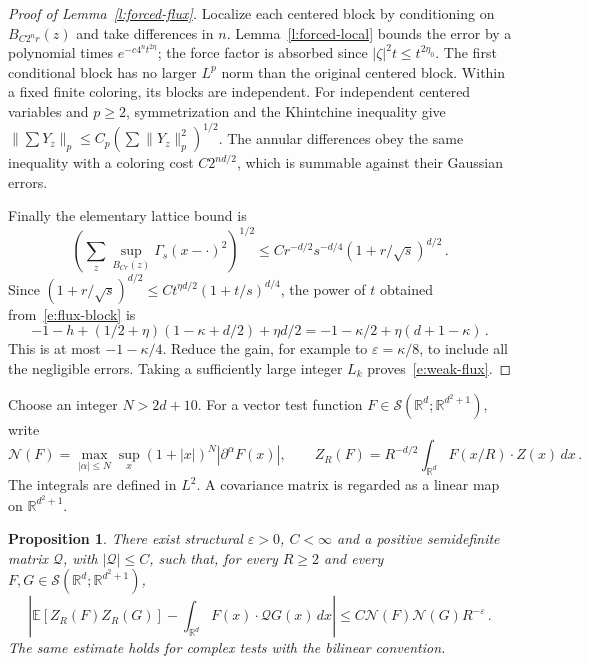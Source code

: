 \documentclass[11pt]{amsart}
\newtheorem{proposition}{Proposition}[section]
\theoremstyle{definition}
\theoremstyle{remark}
\numberwithin{equation}{section}
\newcommand{\E}{\mathbb E}
\newcommand{\R}{\mathbb R}
\newcommand{\dd}{\,d}
\newcommand{\abs}[1]{\left|#1\right|}
\begin{document}
\begin{proof}[Proof of Lemma~\ref{l:forced-flux}]
Localize each centered block by conditioning on $B_{C2^nr}(z)$ and take differences in $n$. Lemma~\ref{l:forced-local} bounds the error by a polynomial times $e^{-c4^nt^{2\eta}}$; the force factor is absorbed since $|\zeta|^2t\leq t^{2\eta_0}$. The first conditional block has no larger $L^p$ norm than the original centered block. Within a fixed finite coloring, its blocks are independent. For independent centered variables and $p\geq2$, symmetrization and the Khintchine inequality give $\|\sum Y_z\|_p\leq C_p(\sum\|Y_z\|_p^2)^{1/2}$. The annular differences obey the same inequality with a coloring cost $C2^{nd/2}$, which is summable against their Gaussian errors.

Finally the elementary lattice bound is
\begin{equation*}
 \left(\sum_z\sup_{B_{Cr}(z)}\Gamma_s(x-\cdot)^2\right)^{1/2}
 \leq Cr^{-d/2}s^{-d/4}(1+r/\sqrt s)^{d/2}\, .
\end{equation*}
Since $(1+r/\sqrt s)^{d/2} \leq Ct^{\eta d/2}(1+t/s)^{d/4}$, the power of $t$ obtained from~\eqref{e:flux-block} is
\begin{equation*}
 -1-h+(1/2+\eta)(1-\kappa+d/2)+\eta d/2
 =-1-\kappa/2+\eta(d+1-\kappa)\, .
\end{equation*}
This is at most $-1-\kappa/4$. Reduce the gain, for example to $\varepsilon=\kappa/8$, to include all the negligible errors. Taking a sufficiently large integer $L_k$ proves~\eqref{e:weak-flux}.
\end{proof}

Choose an integer $N>2d+10$. For a vector test function $F\in\mathcal S(\R^d;\R^{d^2+1})$, write
\begin{equation*}
 \mathcal N(F)=\max_{|\alpha|\leq N}
  \sup_x(1+|x|)^N|\partial^\alpha F(x)|,
 \qquad
 Z_R(F)=R^{-d/2}\int_{\R^d}F(x/R)\cdot Z(x)\dd x\, .
\end{equation*}
The integrals are defined in $L^2$. A covariance matrix is regarded as a linear map on $\R^{d^2+1}$.

\begin{proposition}\label{p:covariance}
There exist structural $\varepsilon>0$, $C<\infty$ and a positive semidefinite matrix $\mathcal Q$, with $|\mathcal Q|\leq C$, such that, for every $R\geq2$ and every $F,G\in\mathcal S(\R^d;\R^{d^2+1})$,
\begin{equation}\label{e:covariance-rate}
 \abs{\E[Z_R(F)Z_R(G)]-\int_{\R^d}F(x)\cdot\mathcal QG(x)\dd x}
 \leq C\mathcal N(F)\mathcal N(G)R^{-\varepsilon}\, .
\end{equation}
The same estimate holds for complex tests with the bilinear convention.
\end{proposition}
\end{document}
